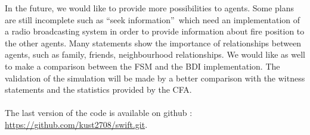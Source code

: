 \documentclass[12pt, a4paper]{memoir} %
\begin{document}
		In the future, we would like to provide more possibilities to agents.
		Some plans are still incomplete such as \textquotedblleft seek information\textquotedblright ~which
		need an implementation of a radio broadcasting system in order to provide information about fire position to the other agents.
		Many statements show the importance of relationships between agents, such as family, friends, neighbourhood relationships.
		We would like as well to make a comparison between the FSM and the BDI implementation.
		The validation of the simulation will be made by a better comparison with the witness statements and the statistics provided by the CFA.
		\paragraph{}
		The last version of the code is available on github : \url{https://github.com/kust2708/swift.git}.
\backmatter



%
\end{document}
